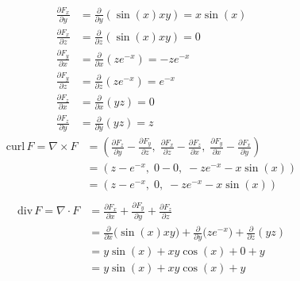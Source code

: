 \documentclass[11pt]{article}
\begin{document}
\begin{solution}
	$$
		\begin{aligned}
			\frac{\partial F_x}{\partial y} & = \frac{\partial}{\partial y} (\sin(x) xy) = x \sin(x) \\
			\frac{\partial F_x}{\partial z} & = \frac{\partial}{\partial z} (\sin(x) xy) = 0         \\
			\frac{\partial F_y}{\partial x} & = \frac{\partial}{\partial x} (ze^{-x}) = -ze^{-x}     \\
			\frac{\partial F_y}{\partial z} & = \frac{\partial}{\partial z} (ze^{-x}) = e^{-x}       \\
			\frac{\partial F_z}{\partial x} & = \frac{\partial}{\partial x} (yz)  = 0                \\
			\frac{\partial F_z}{\partial y} & = \frac{\partial}{\partial y} (yz)  = z
		\end{aligned}
	$$
	$$
		\begin{aligned}
			\text{curl}\, F = \nabla \times F & = \left(
			\frac{\partial F_z}{\partial y} - \frac{\partial F_y}{\partial z},\;
			\frac{\partial F_x}{\partial z} - \frac{\partial F_z}{\partial x},\;
			\frac{\partial F_y}{\partial x} - \frac{\partial F_x}{\partial y}
			\right)                                                                                         \\
			                                  & = \left( z - e^{-x},\; 0 - 0,\; -ze^{-x} - x\sin(x) \right) \\
			                                  & = \left( z - e^{-x},\; 0,\; -ze^{-x} - x\sin(x) \right)     \\[1em]
		\end{aligned}
	$$
	$$
		\begin{aligned}
			\text{div}\, F = \nabla \cdot F & = \frac{\partial F_x}{\partial x} + \frac{\partial F_y}{\partial y} + \frac{\partial F_z}{\partial z}                             \\
			                                & = \frac{\partial}{\partial x}\big(\sin(x)xy\big) + \frac{\partial}{\partial y}\big(ze^{-x}\big) + \frac{\partial}{\partial z}(yz) \\
			                                & = y\sin(x) + xy\cos(x) + 0 + y                                                                                                    \\
			                                & = y\sin(x) + xy\cos(x) + y
		\end{aligned}
	$$
\end{solution}
\end{document}
